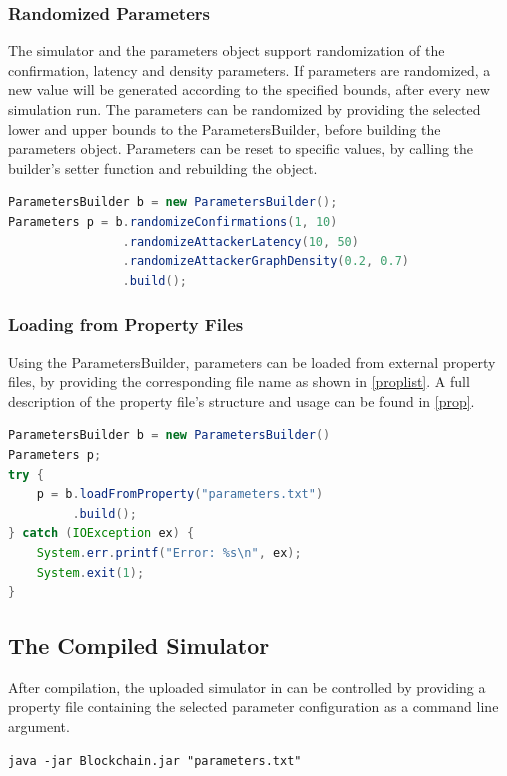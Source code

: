 \documentclass[a4paper,12pt,twoside]{report}
\begin{document}
\subsubsection{Randomized Parameters}
The simulator and the parameters object support randomization of the confirmation, latency and density parameters. If parameters are randomized, a new value will be generated according to the specified bounds, after every new simulation run. The parameters can be randomized by providing the selected lower and upper bounds to the ParametersBuilder, before building the parameters object. Parameters can be reset to specific values, by calling the builder's setter function and rebuilding the object.
\begin{lstlisting}[language=Java, caption=Randomizing parameters using the ParametersBuilder]
ParametersBuilder b = new ParametersBuilder();
Parameters p = b.randomizeConfirmations(1, 10)
                .randomizeAttackerLatency(10, 50)
                .randomizeAttackerGraphDensity(0.2, 0.7)
                .build();
\end{lstlisting}
\subsubsection{Loading from Property Files}
Using the ParametersBuilder, parameters can be loaded from external property files, by providing the corresponding file name as shown in \autoref{proplist}. A full description of the property file's structure and usage can be found in \autoref{prop}.

\begin{lstlisting}[language=Java, caption=Loading parameters from property file,label=proplist]
ParametersBuilder b = new ParametersBuilder()
Parameters p;
try {
	p = b.loadFromProperty("parameters.txt")
	     .build();
} catch (IOException ex) {
	System.err.printf("Error: %s\n", ex);
	System.exit(1);
}
\end{lstlisting}
\subsection{The Compiled Simulator}
After compilation, the uploaded simulator in \cite{github} can be controlled by providing a property file containing the selected parameter configuration as a command line argument.
\begin{lstlisting}[caption=Launching the simulator from the command line,label=cmd]
java -jar Blockchain.jar "parameters.txt"
\end{lstlisting}
\end{document}
